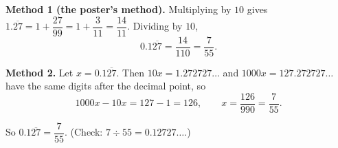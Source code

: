 \textbf{Method 1 (the poster's method).} Multiplying by $10$ gives $1.\overline{27}=1+\dfrac{27}{99}=1+\dfrac{3}{11}=\dfrac{14}{11}$. Dividing by $10$,
\[0.1\overline{27}=\dfrac{14}{110}=\dfrac{7}{55}.\]

\textbf{Method 2.} Let $x=0.1\overline{27}$. Then $10x=1.272727\ldots$ and $1000x=127.272727\ldots$ have the same digits after the decimal point, so
\[1000x-10x=127-1=126,\qquad x=\dfrac{126}{990}=\dfrac{7}{55}.\]

So $0.1\overline{27}=\boxed{\dfrac{7}{55}}$. (Check: $7\div55=0.12727\ldots$.)
